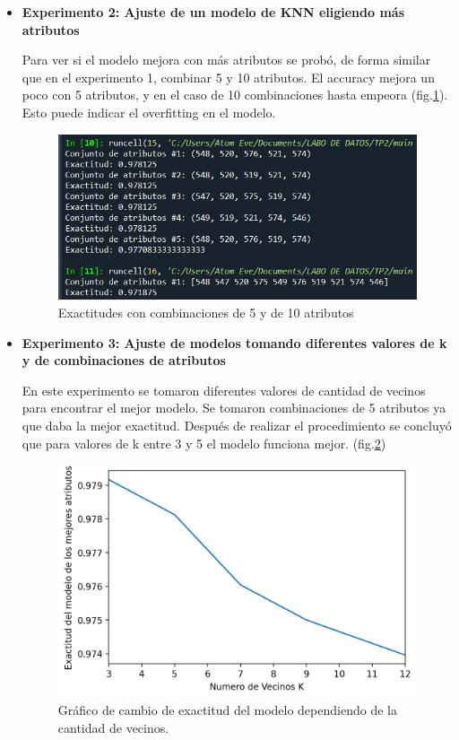 \documentclass[11pt,a4paper, twocolumn]{article}
\begin{document}
\begin{itemize}
    \item[]
       \textbf{Experimento 2: Ajuste de un modelo de KNN eligiendo más atributos}

Para ver si el modelo mejora con más atributos se probó, de forma similar que en el experimento 1, combinar 5 y 10 atributos.
El accuracy mejora un poco con 5 atributos, y en el caso de 10 combinaciones hasta empeora (fig.\ref{fig:8}). Esto puede indicar el overfitting en el modelo.
\begin{figure}[H]
	\centering
	\includegraphics[scale=0.7]{figuras/2a_2.jpg}
	\caption{Exactitudes con combinaciones de 5 y de 10 atributos}
	\label{fig:8}
\end{figure}
\end{itemize}

\begin{itemize}
    \item []
    \textbf{Experimento 3: Ajuste de modelos tomando diferentes valores de k y de combinaciones de atributos}

En este experimento se tomaron diferentes valores de cantidad de vecinos para encontrar el mejor modelo. Se tomaron combinaciones de 5 atributos ya que daba la mejor exactitud. Después de realizar el procedimiento se concluyó que para valores de k entre 3 y 5 el modelo funciona mejor. (fig.\ref{fig:9})

\begin{figure}[H]
	\centering
	\includegraphics[scale=0.8]{figuras/2e.png}
	\caption{Gráfico de cambio de exactitud del modelo dependiendo de la cantidad de vecinos.}
	\label{fig:9}
\end{figure}

\end{itemize}
\end{document}
